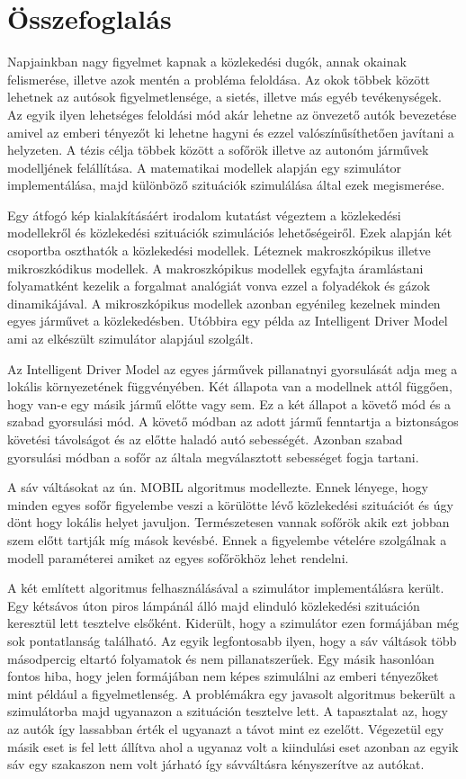 \chapter*{Összefoglalás}
Napjainkban nagy figyelmet kapnak a közlekedési dugók, annak okainak felismerése, illetve azok mentén a probléma feloldása. Az okok többek között lehetnek az autósok figyelmetlensége, a sietés, illetve más egyéb tevékenységek. Az egyik ilyen lehetséges feloldási mód akár lehetne az önvezető autók bevezetése amivel az emberi tényezőt ki lehetne hagyni és ezzel valószínűsíthetően javítani a helyzeten. A tézis célja többek között a sofőrök illetve az autonóm járművek modelljének felállítása. A matematikai modellek alapján egy szimulátor implementálása, majd különböző szituációk szimulálása által ezek megismerése.

Egy átfogó kép kialakításáért irodalom kutatást végeztem a közlekedési modellekről és közlekedési szituációk szimulációs lehetőségeiről. Ezek alapján két csoportba oszthatók a közlekedési modellek. Léteznek makroszkópikus illetve mikroszkódikus modellek. A makroszkópikus modellek egyfajta áramlástani folyamatként kezelik a forgalmat analógiát vonva ezzel a folyadékok és gázok dinamikájával. A mikroszkópikus modellek azonban egyénileg kezelnek minden egyes járművet a közlekedésben. Utóbbira egy példa az Intelligent Driver Model ami az elkészült szimulátor alapjául szolgált.

Az Intelligent Driver Model az egyes járművek pillanatnyi gyorsulását adja meg a lokális környezetének függvényében. Két állapota van a modellnek attól függően, hogy van-e egy másik jármű előtte vagy sem. Ez a két állapot a követő mód és a szabad gyorsulási mód. A követő módban az adott jármű fenntartja a biztonságos követési távolságot és az előtte haladó autó sebességét. Azonban szabad gyorsulási módban a sofőr az általa megválasztott sebességet fogja tartani.

A sáv váltásokat az ún. MOBIL algoritmus modellezte. Ennek lényege, hogy minden egyes sofőr figyelembe veszi a körülötte lévő közlekedési szituációt és úgy dönt hogy lokális helyet javuljon. Természetesen vannak sofőrök akik ezt jobban szem előtt tartják míg mások kevésbé. Ennek a figyelembe vételére szolgálnak a modell paraméterei amiket az egyes sofőrökhöz lehet rendelni.

A két említett algoritmus felhasználásával a szimulátor implementálásra került. Egy kétsávos úton piros lámpánál álló majd elinduló közlekedési szituáción keresztül lett tesztelve elsőként. Kiderült, hogy a szimulátor ezen formájában még sok pontatlanság található. Az egyik legfontosabb ilyen, hogy a sáv váltások több másodpercig eltartó folyamatok és nem pillanatszerűek.  Egy másik hasonlóan fontos hiba, hogy jelen formájában nem képes szimulálni az emberi tényezőket mint például a figyelmetlenség. A problémákra egy javasolt algoritmus bekerült a szimulátorba majd ugyanazon a szituáción tesztelve lett. A tapasztalat az, hogy az autók így lassabban érték el ugyanazt a távot mint ez ezelőtt. Végezetül egy másik eset is fel lett állítva ahol a ugyanaz volt a kiindulási eset azonban az egyik sáv egy szakaszon nem volt járható így sávváltásra kényszerítve az autókat.

